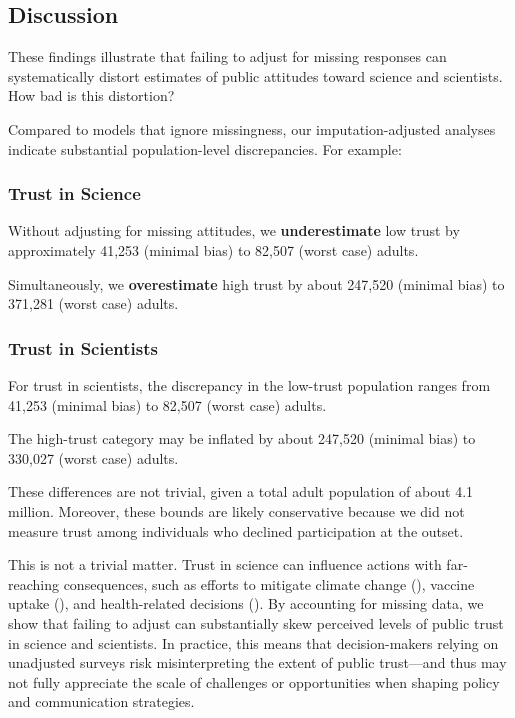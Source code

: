 \documentclass[
  single column]{article}
\begin{document}
\subsection{Discussion}\label{discussion}

These findings illustrate that failing to adjust for missing responses
can systematically distort estimates of public attitudes toward science
and scientists. How bad is this distortion?

Compared to models that ignore missingness, our imputation-adjusted
analyses indicate substantial population-level discrepancies. For
example:

\subsubsection{Trust in Science}\label{trust-in-science}

Without adjusting for missing attitudes, we \textbf{underestimate} low
trust by approximately 41,253 (minimal bias) to 82,507 (worst case)
adults.

Simultaneously, we \textbf{overestimate} high trust by about 247,520
(minimal bias) to 371,281 (worst case) adults.

\subsubsection{Trust in Scientists}\label{trust-in-scientists-1}

For trust in scientists, the discrepancy in the low-trust population
ranges from 41,253 (minimal bias) to 82,507 (worst case) adults.

The high-trust category may be inflated by about 247,520 (minimal bias)
to 330,027 (worst case) adults.

These differences are not trivial, given a total adult population of
about 4.1 million. Moreover, these bounds are likely conservative
because we did not measure trust among individuals who declined
participation at the outset.

This is not a trivial matter. Trust in science can influence actions
with far-reaching consequences, such as efforts to mitigate climate
change (),
vaccine uptake (), and health-related decisions
(). By
accounting for missing data, we show that failing to adjust can
substantially skew perceived levels of public trust in science and
scientists. In practice, this means that decision-makers relying on
unadjusted surveys risk misinterpreting the extent of public trust---and
thus may not fully appreciate the scale of challenges or opportunities
when shaping policy and communication strategies.
\end{document}
